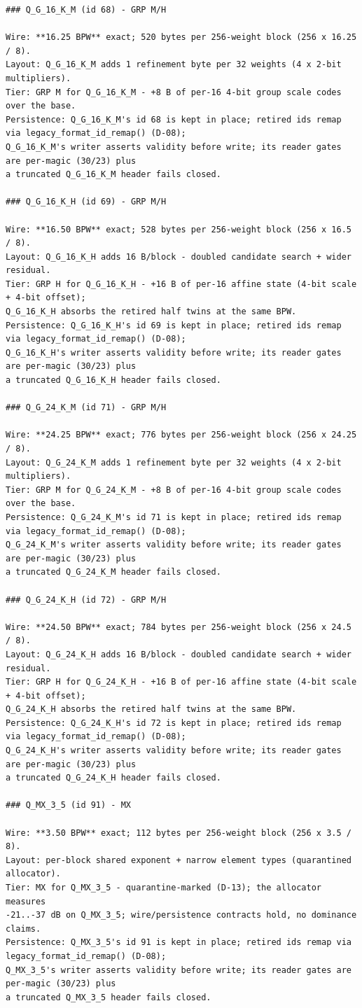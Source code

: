 \begin{Verbatim}[breaklines,breakanywhere,fontsize=\footnotesize]
### Q_G_16_K_M (id 68) - GRP M/H

Wire: **16.25 BPW** exact; 520 bytes per 256-weight block (256 x 16.25 / 8).
Layout: Q_G_16_K_M adds 1 refinement byte per 32 weights (4 x 2-bit multipliers).
Tier: GRP M for Q_G_16_K_M - +8 B of per-16 4-bit group scale codes over the base.
Persistence: Q_G_16_K_M's id 68 is kept in place; retired ids remap via legacy_format_id_remap() (D-08);
Q_G_16_K_M's writer asserts validity before write; its reader gates are per-magic (30/23) plus
a truncated Q_G_16_K_M header fails closed.

### Q_G_16_K_H (id 69) - GRP M/H

Wire: **16.50 BPW** exact; 528 bytes per 256-weight block (256 x 16.5 / 8).
Layout: Q_G_16_K_H adds 16 B/block - doubled candidate search + wider residual.
Tier: GRP H for Q_G_16_K_H - +16 B of per-16 affine state (4-bit scale + 4-bit offset);
Q_G_16_K_H absorbs the retired half twins at the same BPW.
Persistence: Q_G_16_K_H's id 69 is kept in place; retired ids remap via legacy_format_id_remap() (D-08);
Q_G_16_K_H's writer asserts validity before write; its reader gates are per-magic (30/23) plus
a truncated Q_G_16_K_H header fails closed.

### Q_G_24_K_M (id 71) - GRP M/H

Wire: **24.25 BPW** exact; 776 bytes per 256-weight block (256 x 24.25 / 8).
Layout: Q_G_24_K_M adds 1 refinement byte per 32 weights (4 x 2-bit multipliers).
Tier: GRP M for Q_G_24_K_M - +8 B of per-16 4-bit group scale codes over the base.
Persistence: Q_G_24_K_M's id 71 is kept in place; retired ids remap via legacy_format_id_remap() (D-08);
Q_G_24_K_M's writer asserts validity before write; its reader gates are per-magic (30/23) plus
a truncated Q_G_24_K_M header fails closed.

### Q_G_24_K_H (id 72) - GRP M/H

Wire: **24.50 BPW** exact; 784 bytes per 256-weight block (256 x 24.5 / 8).
Layout: Q_G_24_K_H adds 16 B/block - doubled candidate search + wider residual.
Tier: GRP H for Q_G_24_K_H - +16 B of per-16 affine state (4-bit scale + 4-bit offset);
Q_G_24_K_H absorbs the retired half twins at the same BPW.
Persistence: Q_G_24_K_H's id 72 is kept in place; retired ids remap via legacy_format_id_remap() (D-08);
Q_G_24_K_H's writer asserts validity before write; its reader gates are per-magic (30/23) plus
a truncated Q_G_24_K_H header fails closed.

### Q_MX_3_5 (id 91) - MX

Wire: **3.50 BPW** exact; 112 bytes per 256-weight block (256 x 3.5 / 8).
Layout: per-block shared exponent + narrow element types (quarantined allocator).
Tier: MX for Q_MX_3_5 - quarantine-marked (D-13); the allocator measures
-21..-37 dB on Q_MX_3_5; wire/persistence contracts hold, no dominance claims.
Persistence: Q_MX_3_5's id 91 is kept in place; retired ids remap via legacy_format_id_remap() (D-08);
Q_MX_3_5's writer asserts validity before write; its reader gates are per-magic (30/23) plus
a truncated Q_MX_3_5 header fails closed.


\end{Verbatim}
